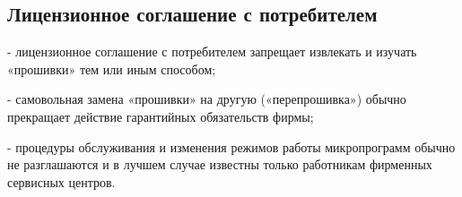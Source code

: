 \subsection{Лицензионное соглашение с потребителем}
 - лицензионное соглашение с потребителем запрещает извлекать и изучать «прошивки» тем или иным способом;

 - самовольная замена «прошивки» на другую («перепрошивка») обычно прекращает действие гарантийных обязательств фирмы;

 - процедуры обслуживания и изменения режимов работы микропрограмм обычно не разглашаются и в лучшем случае известны только работникам фирменных сервисных центров.
